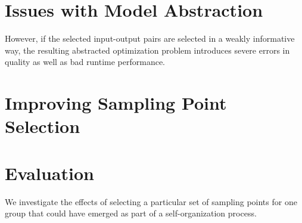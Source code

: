 \documentclass[conference]{IEEEtran}
\begin{document}


\section{Issues with Model Abstraction}
However, if
the selected input-output pairs are selected in a weakly informative way, the resulting abstracted
optimization problem introduces severe errors in quality as well as bad runtime performance.

\section{Improving Sampling Point Selection}

\section{Evaluation}
We investigate the effects of selecting a particular set of 
sampling points for one group that could have emerged as part
of a self-organization process.





\end{document}
